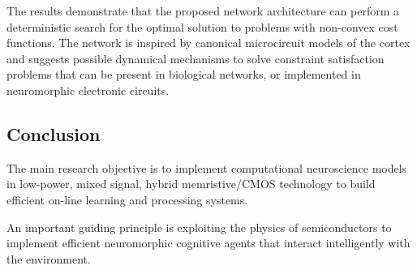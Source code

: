 \documentclass[main]{subfiles}
\begin{document}
The results demonstrate that the proposed network architecture can perform a deterministic search for the optimal solution to problems with non-convex cost functions. The network is inspired by canonical microcircuit models of the cortex and suggests possible dynamical mechanisms to solve constraint satisfaction problems that can be present in biological networks, or implemented in neuromorphic electronic circuits.

\subsection{Conclusion}

The main research objective is to implement computational neuroscience models in low-power, mixed signal, hybrid memristive/CMOS technology to build efficient on-line learning and processing systems.

An important guiding principle is exploiting the physics of semiconductors to implement efficient neuromorphic cognitive agents that interact intelligently with the environment.
\end{document}

